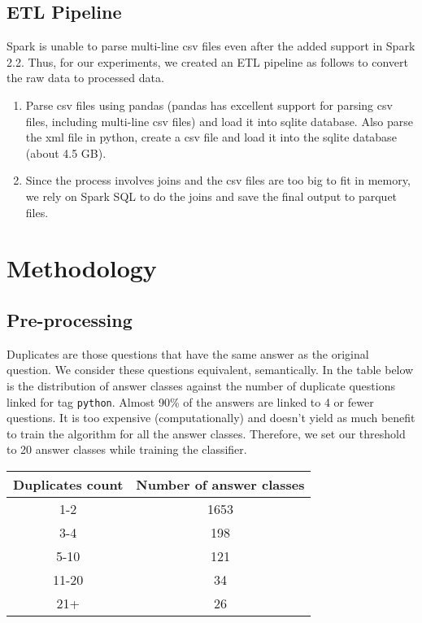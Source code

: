 \documentclass{article}
\begin{document}
\subsection{ETL Pipeline}
Spark\cite{spark} is unable to parse multi-line csv files even after the added support in Spark 2.2. Thus, for our experiments, we created an ETL pipeline as follows to convert the raw data to processed data.
\begin{enumerate}
	\item Parse csv files using pandas\cite{pandas} (pandas has excellent support for parsing csv files, including multi-line csv files) and load it into sqlite database. Also parse the xml file in python, create a csv file and load it into the sqlite\cite{sqlite} database (about 4.5 GB).
	\item Since the process involves joins and the csv files are too big to fit in memory, we rely on Spark SQL to do the joins and save the final output to parquet files.
\end{enumerate}

\section{Methodology}
\subsection{Pre-processing}
Duplicates are those questions that have the same answer as the original question. We consider these questions equivalent, semantically. In the table below is the distribution of answer classes against the number of duplicate questions linked for tag \texttt{python}. Almost 90\% of the answers are linked to 4 or fewer questions. It is too expensive (computationally) and doesn't yield as much benefit to train the algorithm for all the answer classes. Therefore, we set our threshold to 20 answer classes while training the classifier.

\begin{center}
	\begin{tabular}
		{|c c|} 
		\hline
		Duplicates count & Number of answer classes\\ 
		\hline\hline
		1-2 & 1653 \\ 
		\hline
		3-4 & 198 \\
		\hline
		5-10 & 121 \\
		\hline
		11-20 & 34 \\
		\hline
		21+ & 26 \\
		\hline
	\end{tabular}
\end{center}
\end{document}
